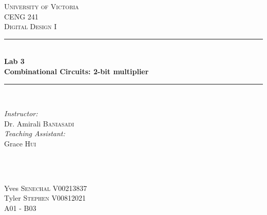 \documentclass[11pt]{article}
\newcommand{\HRule}{\rule{\linewidth}{0.5mm}}
\begin{document}

\begin{titlepage}

\center
 
\textsc{\LARGE University of Victoria}\\[1cm] 	%
\textsc{\Large CENG 241}\\[0.5cm] 			%
\textsc{\large Digital Design I}\\[0.5cm] 		%


\HRule \\[0.4cm]
{\huge \bfseries Lab 3 \\ Combinational Circuits: 2-bit multiplier}\\[0.2cm] %
\HRule \\[1.5cm]
 
 
\begin{minipage}{0.7\textwidth}
\begin{flushleft} 

\large\emph{Instructor:} \\
Dr. Amirali \textsc{Baniasadi} \\
\vspace{12 pt}
\emph{Teaching Assistant:} \\
Grace \textsc{Hui}

\end{flushleft}
\end{minipage}
~
\begin{minipage}{0.1\textwidth}
\begin{flushright} \large
\vspace{12 pt}
\end{flushright}
\end{minipage}\\[2cm]


\Large Yves \textsc{Senechal}
\large V00213837	\\
\Large Tyler \textsc{Stephen}
\large V00812021	\\
A01 - B03\\[1.5cm] 



\end{titlepage}
\end{document}
